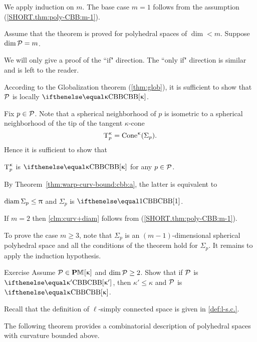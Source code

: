 We apply induction on $m$.
The base case $m=1$ follows from the assumption (\ref{SHORT.thm:poly-CBB:m-1}).

Assume that the theorem is proved for polyhedral spaces  of $\dim <m$. Suppose  $\mathop{\rm dim}\nolimits\mathcal{P}=m$.

We will only give a proof of the ``if" direction. The ``only if" direction is similar and is left to the reader.


According to the Globalization theorem (\ref{thm:glob}),
it is sufficient to show that 
$\mathcal{P}$  is locally $\Alex\kappa$. 

Fix $p\in \spc{P}$.
Note that a spherical neighborhood of $p$
is isometric
to a  spherical neighborhood of the tip of the tangent $\kappa$-cone 
$$\T_p\mc\kappa\z
=
\Cone\mc\kappa(\Sigma_p).$$
Hence it is sufficient to show that 
\begin{clm}{}
 $\text{\rm T}_p^{\upkappa}$ is $\Alex\kappa$ for any $p\in \spc{P}$.
\end{clm}

By Theorem~\ref{thm:warp-curv-bound:cbb:a}, 
the latter is equivalent to 
\begin{clm}{}\label{clm:curv+diam}
$\diam\Sigma_p\le \pi$ and $\Sigma_p$ is $\Alex1$.
\end{clm}


If $m=2$ then \ref{clm:curv+diam} follows from (\ref{SHORT.thm:poly-CBB:m-1}).

To prove the case $m\ge 3$,
note that $\Sigma_p$ is an $(m-1)$-dimensional spherical polyhedral space and all the conditions of the theorem hold for $\Sigma_p$.
It remains to apply the induction hypothesis.\qeds

\begin{thm}{Exercise}
Assume  $\spc{P}\in\PM{}\kappa$ and $\dim \spc{P}\ge 2$. 
Show that 
if $\mathcal{P}$ is $\Alex{\kappa'}$, then $\kappa'\le \kappa$ and $\mathcal{P}$ is $\Alex{\kappa}$.
\end{thm}


Recall that the definition of $\ell$-simply connected space is 
given in \ref{def:l-s.c.}.

The following theorem provides a combinatorial description of polyhedral spaces with curvature bounded above.


